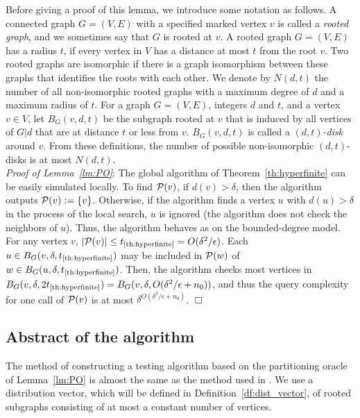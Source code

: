 \documentclass[11pt]{article}
\newcommand{\qed}{\hspace*{\fill} $\Box$}
\begin{document}
Before giving a proof of this lemma, we introduce some notation as follows. 
A connected graph $G = (V,E)$ with a specified marked vertex $v$ is called a
{\em rooted graph}, and we sometimes say that $G$ is rooted at $v$.  
A rooted graph $G=(V,E)$ has a radius $t$, 
if every vertex in $V$ has a distance at most $t$ from the root $v$. 
Two rooted graphs are isomorphic if there is a graph isomorphism between these graphs 
that identifies the roots with each other. 
We denote by $N(d,t)$ the number of all non-isomorphic 
rooted graphs with a maximum degree of $d$ and a maximum
radius of $t$. 
For a graph $G=(V,E)$, integers $d$ and $t$, 
and a vertex $v \in V$, let $B_G(v,d,t)$ be the subgraph  
rooted at $v$ that is induced by all vertices 
of $G|d$ that are at distance $t$ or less from $v$. 
$B_G(v,d,t)$ is called a {\em $(d,t)$-disk} around $v$.  
From these definitions, the number of possible non-isomorphic 
$(d,t)$-disks is at most $N(d,t)$. \\




\noindent
{\em Proof of Lemma~\ref{lm:PO}}: 
The global algorithm of Theorem~\ref{th:hyperfinite} 
can be easily simulated locally. 
To find ${\cal P}(v)$, 
if $d(v) > \delta$, then the algorithm outputs ${\cal P}(v) := \{ v \}$. 
Otherwise, if the algorithm finds a vertex $u$ with $d(u) > \delta$ 
in the process of the local search, 
$u$ is ignored (the algorithm does not check the neighbors of $u$). 
Thus, the algorithm behaves as on the bounded-degree model. 
For any vertex $v$, 
$|{\cal P}(v)| \leq t_{\mbox{\scriptsize \ref{th:hyperfinite}}} = O(\delta^2/\epsilon)$. 
Each $u \in B_G(v,\delta,t_{\mbox{\scriptsize \ref{th:hyperfinite}}})$ 
may be included in 
${\cal P}(w)$ of $w \in B_G(u,\delta,t_{\mbox{\scriptsize \ref{th:hyperfinite}}})$. 
Then, the algorithm checks most vertices in 
$B_G(v,\delta,2t_{\mbox{\scriptsize \ref{th:hyperfinite}}}) = B_G(v,\delta,O(\delta^2/\epsilon +n_0))$, 
and thus the query complexity for one call of ${\cal P}(v)$ is at most 
$\delta^{O(\delta^2/\epsilon + n_0)}$. \qed\\



\subsection{Abstract of the algorithm}


The method of constructing a testing algorithm based on the partitioning oracle of Lemma~\ref{lm:PO} is almost the same as the method used in \cite{NS_Testable_SJCOMP13}. 
We use a distribution vector, which will be defined in Definition~\ref{df:dist_vector}, 
of rooted subgraphs consisting of at most a constant number of vertices. 
\end{document}
